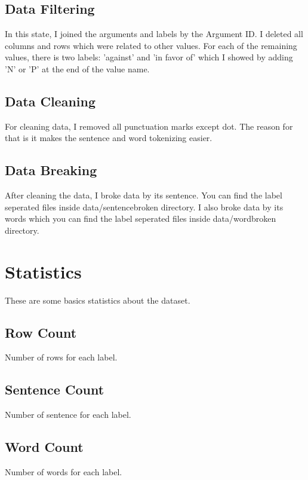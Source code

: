 \subsection{Data Filtering}
In this state, I joined the arguments and labels by the Argument ID. I deleted all columns and rows which were related to other values.
For each of the remaining values, there is two labels: 'against' and 'in favor of' which I showed by adding 'N' or 'P' at the end of the value name.

\subsection{Data Cleaning}
For cleaning data, I removed all punctuation marks except dot. The reason for that is it makes the sentence and word tokenizing easier.

\subsection{Data Breaking}
After cleaning the data, I broke data by its sentence. You can find the label seperated files inside data/sentencebroken directory. I also
broke data by its words which you can find the label seperated files inside data/wordbroken directory.

\section{Statistics}
These are some basics statistics about the dataset.

\subsection{Row Count}
Number of rows for each label.
\begin{adjustbox}{max width=\textwidth}
\end{adjustbox}

\subsection{Sentence Count}
Number of sentence for each label.
\begin{adjustbox}{max width=\textwidth}
\end{adjustbox}

\subsection{Word Count}
Number of words for each label.
\begin{adjustbox}{max width=\textwidth}
\end{adjustbox}

